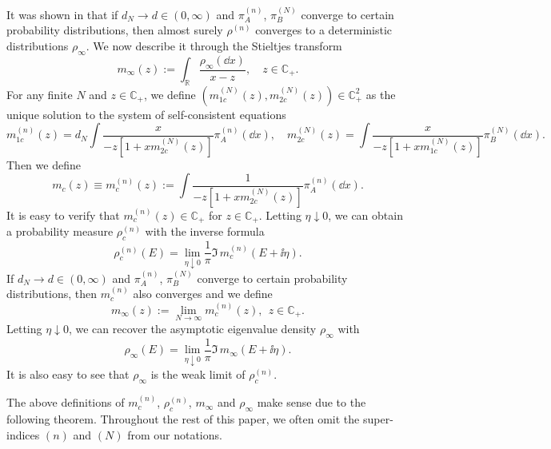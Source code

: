 It was shown in \cite{Separable} that if $d_N \to d \in (0,\infty)$ and $\pi_A^{(n)}$, $\pi_B^{(N)}$ converge to certain probability distributions, then almost surely $\rho^{(n)}$ converges to a deterministic distributions $ \rho_{\infty}$. We now describe it through the Stieltjes transform
$$m_{\infty}(z):=\int_{\mathbb R} \frac{\rho_{\infty}(\dd x)}{x-z}, \quad z \in \mathbb C_+.$$
For any finite $N$ and $z\in \mathbb C_+$, we define $(m^{(N)}_{1c}(z),m^{(N)}_{2c}(z))\in \mathbb C_+^2$ as the unique solution to the system of self-consistent equations
\begin{equation}\label{separa_m12}
{m^{(n)}_{1c}(z)} = d_N \int\frac{x}{-z\left[1+xm^{(N)}_{2c}(z) \right]} \pi_A^{(n)}(\dd x), \quad  {m^{(N)}_{2c}(z)} =  \int\frac{x}{-z\left[1+xm^{(N)}_{1c}(z) \right]} \pi_B^{(N)}(\dd x).
\end{equation}
Then we define
\begin{equation}\label{def_mc}
m_c(z)\equiv m_c^{(n)}(z):= \int\frac{1}{-z\left[1+xm^{(N)}_{2c}(z) \right]} \pi_A^{(n)}(\dd x).
\end{equation}
It is easy to verify that $m_c^{(n)}(z)\in \mathbb C_+$ for $z\in \mathbb C_+$. Letting $\eta \downarrow 0$, we can obtain a probability measure $\rho_{c}^{(n)}$ with the inverse formula
\begin{equation}\label{ST_inverse}
\rho_{c}^{(n)}(E) = \lim_{\eta\downarrow 0} \frac{1}{\pi}\Im\, m^{(n)}_{c}(E+\ii \eta).
\end{equation}
If $d_N \to d \in (0,\infty)$ and $\pi_A^{(n)}$, $\pi_B^{(N)}$ converge to certain probability distributions, then $m_c^{(n)}$ also converges and we define
$$m_{\infty}(z):=\lim_{N\to \infty} m_c^{(n)}(z), \ \ z \in \mathbb C_+.$$
Letting $\eta \downarrow 0$, we can recover the asymptotic eigenvalue density $ \rho_{\infty}$ with
\begin{equation}\label{ST_inverse}
\rho_{\infty}(E) = \lim_{\eta\downarrow 0} \frac{1}{\pi}\Im\, m_{\infty}(E+\ii \eta).
\end{equation}
It is also easy to see that $\rho_\infty$ is the weak limit of $\rho_{c}^{(n)}$. 

The above definitions of $m_c^{(n)}$, $\rho_c^{(n)}$, $m_\infty$ and $\rho_\infty$ make sense due to the following theorem. Throughout the rest of this paper, we often omit the super-indices $(n)$ and $(N)$ from our notations. 

